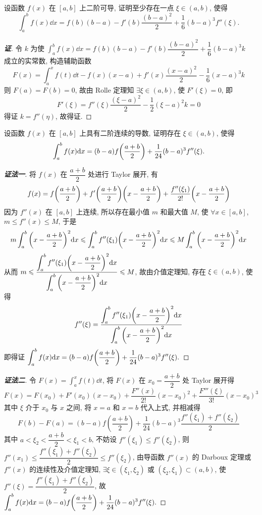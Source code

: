 \begin{example}
    设函数 $f(x)$ 在 $[a,b]$ 上二阶可导, 证明至少存在一点 $\xi\in(a,b)$, 使得
    $$\int_{a}^{b}f(x)\dd x=f(b)(b-a)-f'(b)\dfrac{(b-a)^2}{2}+\dfrac{1}{6}(b-a)^3f''(\xi).$$
\end{example}
\begin{proof}[{\songti \textbf{证}}]
    令 $k$ 为使 $\displaystyle \int_{a}^{b}f(x)\dd x=f(b)(b-a)-f'(b)\dfrac{(b-a)^2}{2}+\dfrac{1}{6}(b-a)^3k$ 成立的实常数, 构造辅助函数
    $$F(x)=\int_{a}^{x}f(t)\dd t-f(x)(x-a)+f'(x)\dfrac{(x-a)^2}{2}-\dfrac{1}{6}(x-a)^3k$$
    则 $F(a)=F(b)=0$, 故由 Rolle 定理知 $\exists\xi\in(a,b)$, 使 $F'(\xi)=0$, 即
    $$F'(\xi)=f''(\xi)\dfrac{(\xi-a)^2}{2}-\dfrac{1}{2}(\xi-a)^2k=0$$
    得证 $k=f''(\eta)$, 故得证.
\end{proof}

\begin{example}
    设函数 $f(x)$ 在 $[a,b]$ 上具有二阶连续的导数, 证明存在 $\xi\in(a,b)$, 使得
    $$\int_{a}^{b}f(x)\dd x=(b-a)f\qty(\dfrac{a+b}{2})+\dfrac{1}{24}(b-a)^3f''(\xi).$$
\end{example}
\begin{proof}[{\songti \textbf{证法一}}]
    将 $f(x)$ 在 $\dfrac{a+b}{2}$ 处进行 Taylor 展开, 有
    $$f(x)=f\qty(\dfrac{a+b}{2})+f'\qty(\dfrac{a+b}{2})\qty(x-\dfrac{a+b}{2})+\dfrac{f''(\xi_1)}{2!}\qty(x-\dfrac{a+b}{2})$$
    因为 $f''(x)$ 在 $[a,b]$ 上连续, 所以存在最小值 $m$ 和最大值 $M$, 使 $\forall x\in[a,b]$, $m\leqslant f''(x) \leqslant M$, 于是
    $$m\int_{a}^{b}\qty(x-\dfrac{a+b}{2})^2\dd x\leqslant \int_{a}^{b}f''(\xi_1)\qty(x-\dfrac{a+b}{2})^2\dd x\leqslant M\int_{a}^{b}\qty(x-\dfrac{a+b}{2})^2\dd x$$
    从而 $\displaystyle m\leqslant \dfrac{\displaystyle \int_{a}^{b}f''(\xi_1)\qty(x-\dfrac{a+b}{2})^2\dd x}{\displaystyle \int_{a}^{b}\qty(x-\dfrac{a+b}{2})^2\dd x}\leqslant M$, 故由介值定理知, 存在 $\xi\in(a,b)$, 使得
    $$f''(\xi)=\dfrac{\displaystyle\int_{a}^{b}f''(\xi_1)\qty(x-\dfrac{a+b}{2})^2\dd x}{\displaystyle \int_{a}^{b}\qty(x-\dfrac{a+b}{2})^2\dd x}$$
    即得证 $\displaystyle\int_{a}^{b}f(x)\dd x=(b-a)f\qty(\dfrac{a+b}{2})+\dfrac{1}{24}(b-a)^3f''(\xi).$
\end{proof}
\begin{proof}[{\songti \textbf{证法二}}]
    令 $\displaystyle F(x)=\int_{a}^{x}f(t)\dd t$, 将 $F(x)$ 在 $x_0=\dfrac{a+b}{2}$ 处 Taylor 展开得
    $$F(x)  =F\left( x_{0}\right) +F'\left( x_{0}\right) \left( x-x_{0}\right) +\dfrac{F''(x)  }{2!}\left( x-x_{0}\right) ^{2}+\dfrac{F'''\left( \xi \right) }{3!}\left( x-x_{0}\right) ^{3}$$
    其中 $\xi$ 介于 $x_0$ 与 $x$ 之间, 将 $x=a$ 和 $x=b$ 代入上式, 并相减得
    $$F\left( b\right) -F\left( a\right) =\left( b-a\right) f\left( \dfrac{a+b}{2}\right) +\dfrac{1}{24}\left( b-a\right) ^{3}\dfrac{f''\left( \xi _{1}\right) +f''\left( \xi _{2}\right) }{2}$$
    其中 $a <\xi _{2} <\dfrac{a+b}{2} <\xi _{1} <b$, 不妨设 $f''(\xi_1)\leqslant f''(\xi_2)$, 则 $f''(x_1)\leqslant \dfrac{f''(\xi_1)+f''(\xi_2)}{2}\leqslant f''(\xi_2)$, 由导函数 $f''(x)$ 的 Darboux 定理或 $f''(x)$ 的连续性及介值定理知,
    $\exists\xi\in(\xi_1,\xi_2)$ 或 $(\xi_2,\xi_1)\subset (a,b)$, 使 $f''(\xi)=\dfrac{f''(\xi_1)+f''(\xi_2)}{2}$, 故 $\displaystyle\int_{a}^{b}f(x)\dd x=(b-a)f\qty(\dfrac{a+b}{2})+\dfrac{1}{24}(b-a)^3f''(\xi).$
\end{proof}
